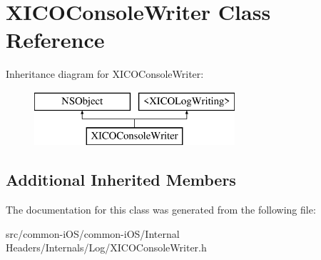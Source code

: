 \hypertarget{interface_x_i_c_o_console_writer}{}\section{X\+I\+C\+O\+Console\+Writer Class Reference}
\label{interface_x_i_c_o_console_writer}
Inheritance diagram for X\+I\+C\+O\+Console\+Writer\+:\begin{figure}[H]
\begin{center}
\leavevmode
\includegraphics[height=2.000000cm]{interface_x_i_c_o_console_writer}
\end{center}
\end{figure}
\subsection*{Additional Inherited Members}


The documentation for this class was generated from the following file\+:\begin{DoxyCompactItemize}
\item 
src/common-\/i\+O\+S/common-\/i\+O\+S/\+Internal Headers/\+Internals/\+Log/X\+I\+C\+O\+Console\+Writer.\+h\end{DoxyCompactItemize}

